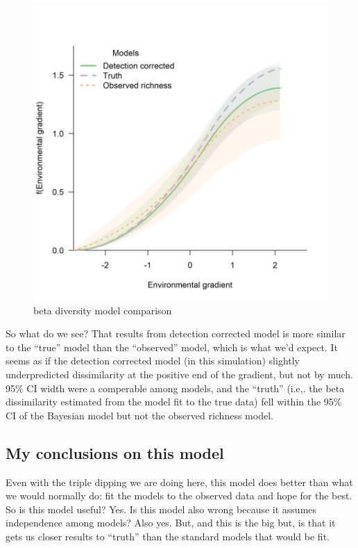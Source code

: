 \documentclass[
]{article}
\begin{document}
\begin{figure}
\centering
\includegraphics{"beta_comparison.jpeg"}
\caption{beta diversity model comparison}
\end{figure}

So what do we see? That results from detection corrected model is more
similar to the ``true'' model than the ``observed'' model, which is what
we'd expect. It seems as if the detection corrected model (in this
simulation) slightly underpredicted dissimilarity at the positive end of
the gradient, but not by much. 95\% CI width were a comperable among
models, and the ``truth'' (i.e,. the beta dissimilarity estimated from
the model fit to the true data) fell within the 95\% CI of the Bayesian
model but not the observed richness model.

\hypertarget{my-conclusions-on-this-model}{%
\subsection{My conclusions on this
model}\label{my-conclusions-on-this-model}}

Even with the triple dipping we are doing here, this model does better
than what we would normally do: fit the models to the observed data and
hope for the best. So is this model useful? Yes. Is this model also
wrong because it assumes independence among models? Also yes. But, and
this is the big but, is that it gets us closer results to ``truth'' than
the standard models that would be fit.
\end{document}
